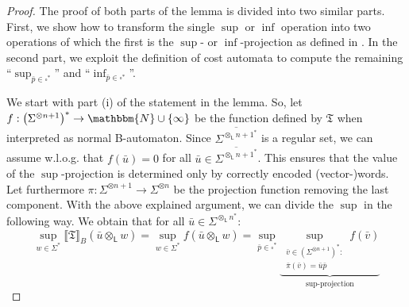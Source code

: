 \documentclass{LMCS}
\newcommand{\nat}{\mathbbm{N}}
\newcommand{\pad}{\square}
\newcommand{\natInf}{\nat \cup \{ \infty \}}
\newcommand{\automatonT}{\mathfrak T}
\newcommand{\semantics}[1]{\llbracket#1\rrbracket}
\newcommand{\padprodL}{\otimes_{\mathsf{L}}}
\newcommand{\alphVector}[2]{#1^{\otimes #2}}
\newcommand{\alphVectorS}[2]{\left(#1^{\otimes #2}\right)^*}
\newcommand{\alphVectorL}[2]{#1^{{\padprodL #2}^*}}
\newcommand{\NalphVectorL}[2]{\overline{#1^{{\padprodL #2}^*}}}
\newcommand{\twosm}[2]{\begin{smallmatrix} #1 \\ #2 \end{smallmatrix}}
\begin{document}
\begin{proof}
The proof of both parts of the lemma is divided into two similar parts. First,
we show how to transform the single $\sup$ or $\inf$ operation into two
operations of which the first is the $\sup$- or $\inf$-projection as defined in
\cite{regularcostfunctions}. In the second part, we exploit the definition of
cost automata to compute the remaining ``$\sup_{\bar p \in \pad^*}$'' and
``$\inf_{\bar p \in \pad^*}$''.

We start with part (i) of the statement in the lemma. So, let $f :
\alphVectorS{\Sigma}{n+1} \to \natInf$ be the function defined by $\automatonT$
when interpreted as normal B-automaton. Since $\NalphVectorL{\Sigma}{n+1}$ is a
regular set, we can assume w.l.o.g. that $f(\bar u) = 0$ for all $\bar u \in
\NalphVectorL{\Sigma}{n+1}$. This ensures that the value of the $\sup$-projection
is determined only by correctly encoded (vector-)words. Let furthermore $\pi:
\alphVector{\Sigma}{n+1}\to \alphVector{\Sigma}{n}$ be the projection function
removing the last component. With the above explained argument, we can divide
the $\sup$ in the following way. We obtain that for
all $\bar u \in \alphVectorL{\Sigma}{n}$:
\[
  \sup_{w \in \Sigma^*} \semantics{\automatonT}_B(\bar u \padprodL w) = 
  \sup_{w \in \Sigma^*} f(\bar u \padprodL w) =  \sup_{\bar p \in \pad^*}
    \underbrace{\sup_{\twosm{\bar v \in
\alphVectorS{\Sigma}{n+1}:}{\bar\pi(\bar v)
     = \bar u \bar p}} f(\bar v)}_{\sup\text{-projection}}
\]
 

\end{proof}
\end{document}
